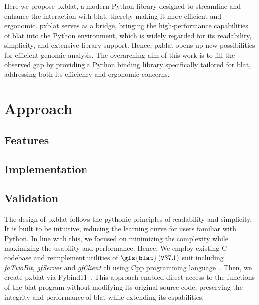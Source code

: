 Here we propose \gls{pxblat}, a modern Python library designed to streamline and enhance the interaction with \gls{blat}, thereby making it more efficient and ergonomic.
\gls{pxblat} serves as a bridge, bringing the high-performance capabilities of \gls{blat}  into the Python environment, which is widely regarded for its readability, simplicity, and extensive library support.
Hence, \gls{pxblat} opens up new possibilities for efficient genomic analysis.
The overarching aim of this work is to fill the observed gap by providing a Python binding library specifically tailored for \gls{blat}, addressing both its efficiency and ergonomic concerns.

\section*{Approach}\label{sec:approach}

\subsection*{Features}\label{ssec:features}

\subsection*{Implementation}\label{ssec:implementation}

\subsection*{Validation}\label{ssec:validation}


The design of \gls{pxblat} follows the pythonic principles of readability and simplicity.
It is built to be intuitive, reducing the learning curve for users familiar with Python.
In line with this, we focused on minimizing the complexity while maximizing the usability and performance.
Hence, We employ existing C codebase and reimplement utilities of \(\mathtt{\gls{blat}}\left(\mathtt{V}37.1\right)\) suit  including \emph{faTwoBit}, \emph{gfServer} and \emph{gfClient} \gls{cli} using Cpp programming language~\citep{kent2002blat}.
Then, we create \gls{pxblat} via Pybind11~\citep{pybind11}.
This approach enabled direct access to the functions of the \gls{blat} program without modifying its original source code, preserving the integrity and performance of \gls{blat} while extending its capabilities.

